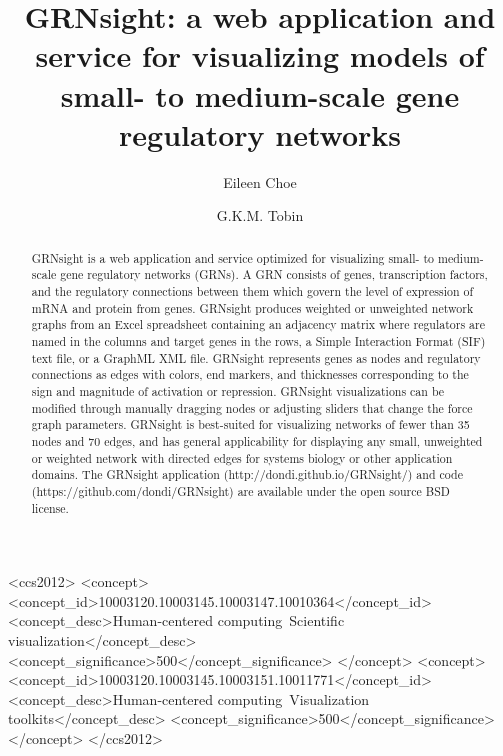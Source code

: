 \documentclass[sigconf,review,anonymous]{acmart}
\begin{document}
\title{GRNsight: a web application and service for visualizing models of small- to medium-scale gene regulatory networks}

\author{Eileen Choe}

\author{G.K.M. Tobin}

\renewcommand{\shortauthors}{B. Trovato et. al.}

\begin{abstract}

GRNsight is a web application and service optimized for visualizing small- to medium-scale gene regulatory networks (GRNs). A GRN consists of genes, transcription factors, and the regulatory connections between them which govern the level of expression of mRNA and protein from genes. GRNsight produces weighted or unweighted network graphs from an Excel spreadsheet containing an adjacency matrix where regulators are named in the columns and target genes in the rows, a Simple Interaction Format (SIF) text file, or a GraphML XML file. GRNsight represents genes as nodes and regulatory connections as edges with colors, end markers, and thicknesses corresponding to the sign and magnitude of activation or repression. GRNsight visualizations can be modified through manually dragging nodes or adjusting sliders that change the force graph parameters. GRNsight is best-suited for visualizing networks of fewer than 35 nodes and 70 edges, and has general applicability for displaying any small, unweighted or weighted network with directed edges for systems biology or other application domains. The GRNsight application (http://dondi.github.io/GRNsight/) and code (https://github.com/dondi/GRNsight) are available under the open source BSD license.

\end{abstract}

%
%
\begin{CCSXML}
<ccs2012>
<concept>
<concept_id>10003120.10003145.10003147.10010364</concept_id>
<concept_desc>Human-centered computing~Scientific visualization</concept_desc>
<concept_significance>500</concept_significance>
</concept>
<concept>
<concept_id>10003120.10003145.10003151.10011771</concept_id>
<concept_desc>Human-centered computing~Visualization toolkits</concept_desc>
<concept_significance>500</concept_significance>
</concept>
</ccs2012>
\end{CCSXML}
\end{document}
